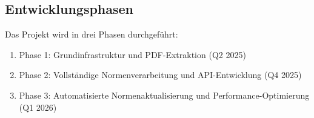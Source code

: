 \subsection{Entwicklungsphasen}
Das Projekt wird in drei Phasen durchgeführt:
\begin{enumerate}
    \item Phase 1: Grundinfrastruktur und PDF-Extraktion (Q2 2025)
    \item Phase 2: Vollständige Normenverarbeitung und API-Entwicklung (Q4 2025)
    \item Phase 3: Automatisierte Normenaktualisierung und Performance-Optimierung (Q1 2026)
\end{enumerate}

